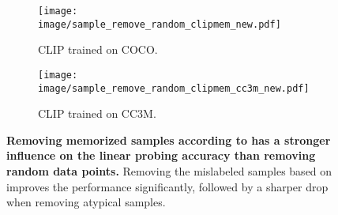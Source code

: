 \begin{figure}[t]
    \centering
    \begin{subfigure}{0.48\columnwidth}
    \centering
    \texttt{[image: image/sample\_remove\_random\_clipmem\_new.pdf]}
    \caption{CLIP trained on COCO.}  
    \label{fig:remove_samples_cooc}
    \end{subfigure}
    \hfill
    \begin{subfigure}[b]{0.48\textwidth}
        \centering
        \centering
    \texttt{[image: image/sample\_remove\_random\_clipmem\_cc3m\_new.pdf]}
    \caption{CLIP trained on CC3M.}
    \label{fig:remove_samples_cc3m}
    \end{subfigure}
    \caption{
    \textbf{Removing memorized samples according to \ours has a stronger influence on the linear probing accuracy than removing random data points.} 
    Removing the mislabeled samples based on \ours improves the performance significantly, followed by a sharper drop when removing atypical samples.
    \vspace{-0.5cm}
    }
    \label{fig:generalization}
\end{figure}


